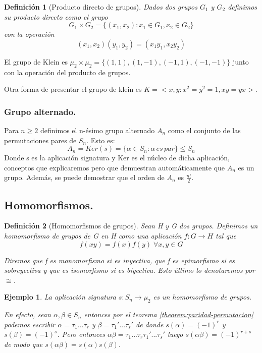 \documentclass{article}
\theoremstyle{theorem-style}  %
\theoremstyle{definition-style}
\newtheorem{definition}{Definición}[section]
\theoremstyle{example-style}
\newtheorem{example}{Ejemplo}[section]
\begin{document}
\begin{definition}[Producto directo de grupos]
Dados dos grupos $G_1$ y $G_2$ definimos su producto directo como el grupo $$G_1 \times G_2 = \{(x_1,x_2):x_1 \in G_1,x_2 \in G_2\}$$ con la operación $$(x_1,x_2)(y_1,y_2) = (x_1y_1,x_2y_2)$$
\end{definition}

El grupo de Klein es $\mu_2 \times \mu_2 = \{(1,1),(1,-1),(-1,1),(-1,-1)\}$ junto con la operación del producto de grupos.

Otra forma de presentar el grupo de klein es $K = <x,y : x^2 = y^2 = 1, xy = yx>$.

\subsubsection{Grupo alternado.}

Para $n \ge 2$ definimos el n-ésimo grupo alternado $A_n$ como el conjunto de las permutaciones pares de $S_n$. Esto es: $$A_n = Ker(s) = \{\alpha \in S_n : \alpha \, es \, par\} \le S_n$$ Donde s es la aplicación signatura y Ker es el núcleo de dicha aplicación, conceptos que explicaremos pero que demuestran automáticamente que $A_n$ es un grupo. Además, se puede demostrar que el orden de $A_n$ es $\frac{n!}{2}$.

\subsection{Homomorfismos.}

\begin{definition}[Homomorfismos de grupos]
Sean H y G dos grupos. Definimos un homomorfismo de grupos de G en H como una aplicación $f:G \rightarrow H$ tal que $$f(xy) = f(x)f(y) \; \forall x,y \in G$$

Diremos que f es monomorfismo si es inyectiva, que f es epimorfismo si es sobreyectiva y que es isomorfismo si es biyectiva. Esto último lo denotaremos por $\cong$.
\end{definition}

\begin{example}
La aplicación signatura $s:S_n \rightarrow \mu_2$ es un homomorfismo de grupos.

En efecto, sean $\alpha,\beta \in S_n$ entonces por el teorema \ref{theorem:paridad-permutacion} podemos escribir $\alpha = \tau_1...\tau_r$ y $\beta = \tau_1'...\tau_s'$ de donde $s(\alpha) = (-1)^r$ y $s(\beta) = (-1)^s$. Pero entonces $\alpha\beta = \tau_1...\tau_r\tau_1'...\tau_s'$ luego $s(\alpha\beta) = (-1)^{r+s}$ de modo que $s(\alpha\beta) = s(\alpha)s(\beta)$.
\end{example}
\end{document}
